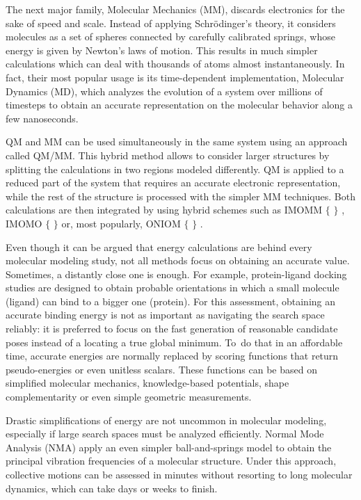 The next major family, Molecular Mechanics (MM), discards electronics for the sake of speed and scale. Instead of applying Schrödinger’s theory, it considers molecules as a set of spheres connected by carefully calibrated springs, whose energy is given by Newton’s laws of motion. This results in much simpler calculations which can deal with thousands of atoms almost instantaneously. In fact, their most popular usage is its time-dependent implementation, Molecular Dynamics (MD), which analyzes the evolution of a system over millions of timesteps to obtain an accurate representation on the molecular behavior along a few nanoseconds.

QM and MM can be used simultaneously in the same system using an approach called QM/MM. This hybrid method allows to consider larger structures by splitting the calculations in two regions modeled differently. QM is applied to a reduced part of the system that requires an accurate electronic representation, while the rest of the structure is processed with the simpler MM techniques. Both calculations are then integrated by using hybrid schemes such as IMOMM $ \{ $ $ \} $ , IMOMO $ \{ $ $ \} $  or, most popularly, ONIOM $ \{ $ $ \} $ .

Even though it can be argued that energy calculations are behind every molecular modeling study, not all methods focus on obtaining an accurate value. Sometimes, a distantly close one is enough. For example, protein-ligand docking studies are designed to obtain probable orientations in which a small molecule (ligand) can bind to a bigger one (protein). For this assessment, obtaining an accurate binding energy is not as important as navigating the search space reliably: it is preferred to focus on the fast generation of reasonable candidate poses instead of a locating a true global minimum. To\ do that in an affordable time, accurate energies are normally replaced by scoring functions that return pseudo-energies or even unitless scalars. These functions can be based on simplified molecular mechanics, knowledge-based potentials, shape complementarity or even simple geometric measurements.

Drastic simplifications of energy are not uncommon in molecular modeling, especially if large search spaces must be analyzed efficiently. Normal Mode Analysis (NMA) apply an even simpler ball-and-springs model to obtain the principal vibration frequencies of a molecular structure. Under this approach, collective motions can be assessed in minutes without resorting to long molecular dynamics, which can take days or weeks to finish.

